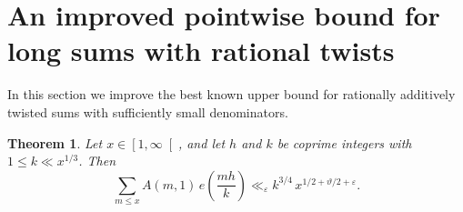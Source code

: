 \documentclass[a4paper,10pt,twoside]{amsart}
\newtheorem{theorem}{Theorem}[section]
\theoremstyle{definition}
\numberwithin{equation}{section}
\newcommand\eps{\varepsilon}
\renewcommand\:{\colon}
\begin{document}

\section{An improved pointwise bound for long sums with rational twists}

\noindent In this section we improve the best known upper bound for rationally additively twisted sums with sufficiently small denominators.
\begin{theorem}
Let $x\in\left[1,\infty\right[$, and let $h$ and $k$ be coprime integers with $1\leqslant k\ll x^{1/3}$. Then
\[\sum_{m\leqslant x}A(m,1)\,e\!\left(\frac{mh}k\right)\ll_\eps k^{3/4}\,x^{1/2+\vartheta/2+\varepsilon}.\]
\end{theorem}
\end{document}
